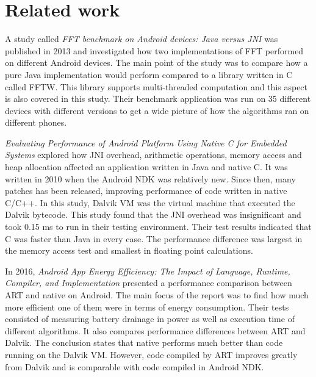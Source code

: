 \section{Related work}
A study called \emph{FFT benchmark on Android devices: Java versus JNI} \cite{Jr2013} was published in 2013 and investigated how two implementations of FFT performed on different Android devices. The main point of the study was to compare how a pure Java implementation would perform compared to a library written in C called FFTW. This library supports multi-threaded computation and this aspect is also covered in this study. Their benchmark application was run on 35 different devices with different versions to get a wide picture of how the algorithms ran on different phones.

\emph{Evaluating Performance of Android Platform Using Native C for Embedded Systems} \cite{Lee2010} explored how JNI overhead, arithmetic operations, memory access and heap allocation affected an application written in Java and native C. It was written in 2010 when the Android NDK was relatively new. Since then, many patches has been released, improving performance of code written in native C/C++. In this study, Dalvik VM was the virtual machine that executed the Dalvik bytecode. This study found that the JNI overhead was insignificant and took 0.15 ms to run in their testing environment. Their test results indicated that C was faster than Java in every case. The performance difference was largest in the memory access test and smallest in floating point calculations.

In 2016, \emph{Android App Energy Efficiency: The Impact of Language, Runtime, Compiler, and Implementation} \cite{Chen2016} presented a performance comparison between ART and native on Android. The main focus of the report was to find how much more efficient one of them were in terms of energy consumption. Their tests consisted of measuring battery drainage in power as well as execution time of different algorithms. It also compares performance differences between ART and Dalvik. The conclusion states that native performs much better than code running on the Dalvik VM. However, code compiled by ART improves greatly from Dalvik and is comparable with code compiled in Android NDK.
